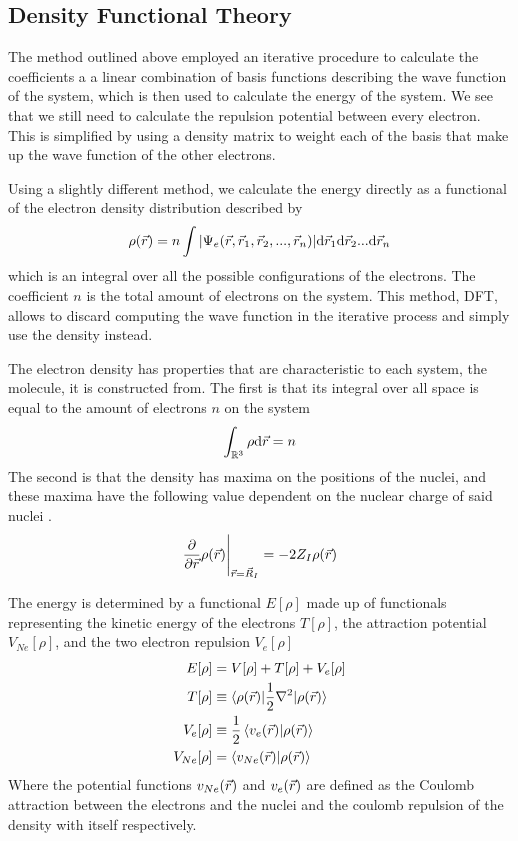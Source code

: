 \documentclass[../master_thesis.tex]{subfiles}
\begin{document}
\subsection{Density Functional Theory}
The method outlined above employed an iterative procedure to calculate the coefficients
a a linear combination of basis functions describing the wave function of the
system, which is then used to calculate the energy of the system. We see that we
still need to calculate the repulsion potential between every electron. This is
simplified by using a density matrix to weight each of the basis that make up the
wave function of the other electrons.

Using a slightly different method, we calculate the energy directly as a functional
of the electron density distribution \cite{Sorland, Cramer:2004} described by
\begin{equation}\label{eq:densityintegral}
  \rho(\vec{r}) = n \int\abs{\Psi_e(\vec{r}, \vec{r}_1, \vec{r}_2,..., \vec{r}_n)} \text{d}\vec{r}_1\text{d}\vec{r}_2...\text{d}\vec{r}_n
\end{equation}
which is an integral over all the possible configurations of the electrons. The
coefficient $n$ is the total amount of electrons on the system. This method,
\ac{DFT}, allows to discard computing the wave function in the iterative process and
simply use the density instead.

The electron density has properties that are characteristic to each system, the
molecule,  it is constructed from. The first is that its integral over all space
is equal to the amount of electrons $n$ on the system \cite{Cramer:2004}
\begin{equation}
  \int_{\mathbb{R}^3}\rho \text{d}\vec{r} = n
\end{equation}
The second is that the density has maxima on the positions of the nuclei, and
these maxima have the following value dependent on the nuclear charge of said
nuclei \cite{Cramer:2004}.
\begin{equation}
 \frac{\partial}{\partial \vec{r}}\rho(\vec{r})\Bigg|_{\vec{r} = \vec{R}_I} = -2Z_I\rho(\vec{r})
\end{equation}

The energy is determined by a functional $E[\rho]$ made up of functionals representing
the kinetic energy of the electrons $T[\rho]$, the attraction potential $V_{Ne}[\rho]$,
and the two electron repulsion $V_{e}[\rho]$ \cite{Sorland, PhysRev.136.B864}
\begin{align}
  E[\rho] &= V[\rho] + T[\rho] + V_{e}[\rho]\\\label{eq:energyfunctional}
  T[\rho] &\equiv\braket{\rho(\vec{r})| \frac{1}{2}\nabla^2| \rho(\vec{r})} \\
  V_{e}[\rho] &\equiv \frac{1}{2}\braket{v_{e}(\vec{r})| \rho(\vec{r})}\\
  V_{Ne}[\rho] &= \braket{v_{Ne}(\vec{r})|\rho(\vec{r})}
\end{align}
Where the potential functions $v_{Ne}(\vec{r})$  and $v_{e}(\vec{r})$ are defined as the Coulomb
attraction between the electrons and the nuclei and the coulomb repulsion of the
density with itself \cite{Sorland} respectively.
\end{document}
